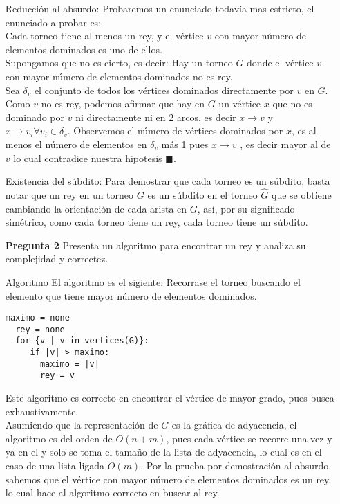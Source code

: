 \documentclass[12pt]{articlels
}
\begin{document}
\begin{itemize}
  \item[Reducción al absurdo:]
    Probaremos un enunciado todavía mas estricto, el enunciado a probar es: \\
Cada torneo tiene al menos un rey, y el vértice $v$ con mayor número de elementos dominados es uno de ellos.\\
    Supongamos que no es cierto, es decir: Hay un torneo $G$ donde el vértice $v$ con mayor número de elementos dominados no es rey. \\
    Sea $\delta_{v}$ el conjunto de todos los vértices dominados directamente por $v$ en $G$.\\
    Como $v$ no es rey, podemos afirmar que hay en $G$ un vértice $x$ que no es dominado por $v$ ni directamente ni en 2 arcos, es decir $ x \rightarrow v$  y 
$ x \rightarrow v_{i} \forall v_{i} \in \delta_{v} $. Observemos el número de vértices dominados por $x$, es al menos el número de elementos en $\delta_{v}$ más 1  pues $x \rightarrow v$ , es decir mayor al de $v$ lo cual contradice nuestra hipotesis  $\blacksquare$.\\

\item[Existencia del súbdito:]
Para demostrar que cada torneo es un súbdito, basta notar que un rey en un torneo $G$ es un súbdito en el torneo $\widehat G$ que se obtiene cambiando la orientación de cada arista en $G$, así, por su significado simétrico, como cada torneo tiene un rey, cada torneo tiene un súbdito.\\

\item[\bf{Pregunta 2}] Presenta un algoritmo para encontrar un rey y analiza su complejidad y correctez.

\item[Algoritmo]
  El algoritmo es el sigiente:
  Recorrase el torneo buscando el elemento que tiene mayor número de elementos dominados.

\begin{lstlisting}[frame=single] 
  maximo = none
  rey = none
  for {v | v in vertices(G)}:
     if |v| > maximo:
       maximo = |v|
       rey = v
\end{lstlisting}
Este algoritmo es correcto en encontrar el vértice de mayor grado, pues busca exhaustivamente.\\
Asumiendo que la representación de $G$ es la gráfica de adyacencia, el algoritmo es del orden de $O(n + m)$, pues cada vértice se recorre una vez y ya en el y solo se toma el tamaño de la lista de adyacencia, lo cual es en el caso de una lista ligada $O(m)$.
Por la prueba por demostración al absurdo, sabemos que el vértice con mayor número de elementos dominados es un rey, lo cual hace al algoritmo correcto en buscar al rey.


\end{itemize}
\end{document}
